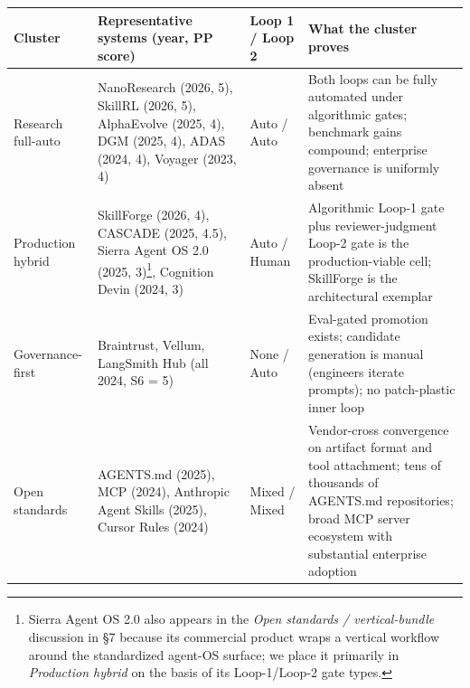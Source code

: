 \documentclass[
]{article}
\newcounter{none} %
\begin{document}
{\def\LTcaptype{none} %
\begin{longtable}[]{@{}
  >{\raggedright\arraybackslash}p{}
  >{\raggedright\arraybackslash}p{}
  >{\raggedright\arraybackslash}p{}
  >{\raggedright\arraybackslash}p{}@{}}
\toprule\noalign{}
\begin{minipage}[b]{\linewidth}\raggedright
Cluster
\end{minipage} & \begin{minipage}[b]{\linewidth}\raggedright
Representative systems (year, PP score)
\end{minipage} & \begin{minipage}[b]{\linewidth}\raggedright
Loop 1 / Loop 2
\end{minipage} & \begin{minipage}[b]{\linewidth}\raggedright
What the cluster proves
\end{minipage} \\
\midrule\noalign{}
\endhead
\bottomrule\noalign{}
\endlastfoot
Research full-auto & NanoResearch (2026, 5), SkillRL (2026, 5),
AlphaEvolve (2025, 4), DGM (2025, 4), ADAS (2024, 4), Voyager (2023, 4)
& Auto / Auto & Both loops can be fully automated under algorithmic
gates; benchmark gains compound; enterprise governance is uniformly
absent \\
Production hybrid & SkillForge (2026, 4), CASCADE (2025, 4.5), Sierra
Agent OS 2.0 (2025, 3)\footnote{Sierra Agent OS 2.0 also appears in the
  \emph{Open standards / vertical-bundle} discussion in §7 because its
  commercial product wraps a vertical workflow around the standardized
  agent-OS surface; we place it primarily in \emph{Production hybrid} on
  the basis of its Loop-1/Loop-2 gate types.}, Cognition Devin (2024, 3)
& Auto / Human & Algorithmic Loop-1 gate plus reviewer-judgment Loop-2
gate is the production-viable cell; SkillForge is the architectural
exemplar \\
Governance-first & Braintrust, Vellum, LangSmith Hub (all 2024, S6 = 5)
& None / Auto & Eval-gated promotion exists; candidate generation is
manual (engineers iterate prompts); no patch-plastic inner loop \\
Open standards & AGENTS.md (2025), MCP (2024), Anthropic Agent Skills
(2025), Cursor Rules (2024) & Mixed / Mixed & Vendor-cross convergence
on artifact format and tool attachment; tens of thousands of AGENTS.md
repositories; broad MCP server ecosystem with substantial enterprise
adoption \\
\end{longtable}
}
\end{document}
